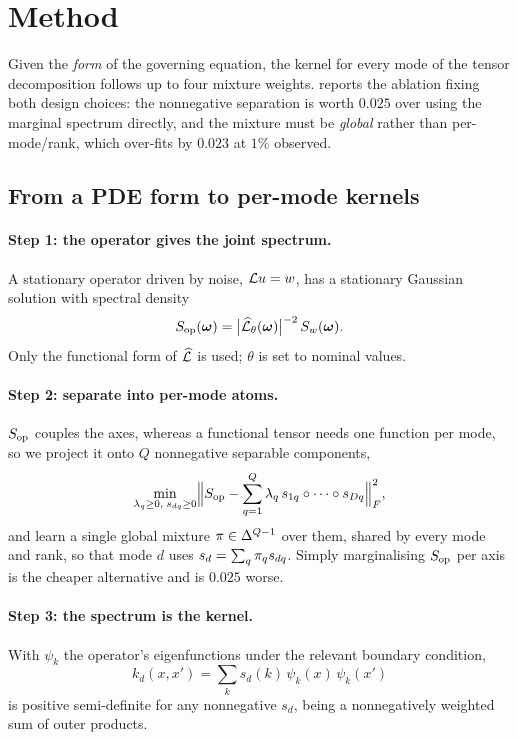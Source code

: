 \section{Method}
\label{sec:method}

Given the \emph{form} of the governing equation, the kernel for every mode of the
tensor decomposition follows up to four mixture weights.  
reports the ablation fixing both design choices: the nonnegative separation is
worth $0.025$ over using the marginal spectrum directly, and the mixture must be
\emph{global} rather than per-mode/rank, which over-fits by $0.023$ at $1\%$
observed.

\subsection{From a PDE form to per-mode kernels}

\paragraph{Step 1: the operator gives the joint spectrum.}
A stationary operator driven by noise, $\mathcal{L} u = w$, has a stationary Gaussian
solution with spectral density
\begin{equation}
  S_{\mathrm{op}}(\bm{\omega}) = \bigl|\widehat{\mathcal{L}}_\theta(\bm{\omega})\bigr|^{-2}\, S_{w}(\bm{\omega}).
  \label{eq:joint-spectrum}
\end{equation}
Only the functional form of $\widehat{\mathcal{L}}$ is used; $\theta$ is set to nominal values.

\paragraph{Step 2: separate into per-mode atoms.}
$S_{\mathrm{op}}$ couples the axes, whereas a functional tensor needs one function per mode,
so we project it onto $Q$ nonnegative separable components,
\begin{equation}
  \min_{\lambda_q \ge 0,\; s_{dq} \ge 0}
  \Bigl\| S_{\mathrm{op}} - \sum_{q=1}^{Q} \lambda_q\, s_{1q} \circ \cdots \circ s_{Dq} \Bigr\|_F^2 ,
  \label{eq:nncp}
\end{equation}
and learn a single global mixture $\pi \in \Delta^{Q-1}$ over them, shared by
every mode and rank, so that mode $d$ uses $s_d = \sum_q \pi_q s_{dq}$.  Simply
marginalising $S_{\mathrm{op}}$ per axis is the cheaper alternative and is $0.025$ worse.

\paragraph{Step 3: the spectrum is the kernel.}
With $\psi_k$ the operator's eigenfunctions under the relevant boundary condition,
\begin{equation}
  k_d(x,x') = \sum_k s_d(k)\, \psi_k(x)\, \psi_k(x')
  \label{eq:psd}
\end{equation}
is positive semi-definite for any nonnegative $s_d$, being a nonnegatively
weighted sum of outer products.

